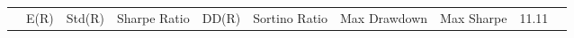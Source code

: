 \begin{tabular}{lrrrrrrrrr}
 & E(R) & Std(R) & Sharpe Ratio & DD(R) & Sortino Ratio & Max Drawdown & %
Max Sharpe & 11.11%
\end{tabular}
